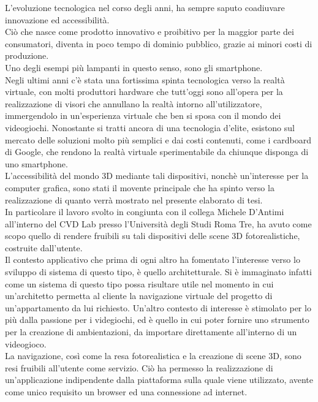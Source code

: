 L’evoluzione tecnologica nel corso degli anni, ha sempre saputo coadiuvare innovazione ed accessibilità.
\\
Ciò che nasce come prodotto innovativo e proibitivo per la maggior parte dei consumatori, diventa in poco tempo di dominio pubblico, grazie ai minori costi di produzione.
\\ 
Uno degli esempi più lampanti in questo senso, sono gli smartphone. 
\\
Negli ultimi anni c’è stata una fortissima spinta tecnologica verso la realtà virtuale, con molti produttori hardware che tutt’oggi sono all’opera per la realizzazione di visori che annullano la realtà intorno all’utilizzatore, immergendolo in un’esperienza virtuale che ben si sposa con il mondo dei videogiochi. Nonostante si tratti ancora di una tecnologia d’elite, esistono sul mercato delle soluzioni molto più semplici e dai costi contenuti, come i cardboard di Google, che rendono la realtà virtuale sperimentabile da chiunque disponga di uno smartphone. 
\\
L’accessibilità del mondo 3D mediante tali dispositivi, nonchè un’interesse per la computer grafica, sono stati il movente principale che ha spinto verso la realizzazione di quanto verrà mostrato nel presente elaborato di tesi.
\\
In particolare il lavoro svolto in congiunta con il collega Michele D’Antimi all’interno del CVD Lab presso l’Università degli Studi Roma Tre, ha avuto come scopo quello di rendere fruibili su tali dispositivi delle scene 3D fotorealistiche, costruite dall’utente.
\\
Il contesto applicativo che prima di ogni altro ha fomentato l’interesse verso lo sviluppo di sistema di questo tipo, è quello architetturale. Si è immaginato infatti come un sistema di questo tipo possa risultare utile nel momento in cui un’architetto permetta al cliente la navigazione virtuale del progetto di un’appartamento da lui richiesto. Un’altro contesto di interesse è stimolato per lo più dalla passione per i videgiochi, ed è quello in cui poter fornire uno strumento per la creazione di ambientazioni, da importare direttamente all’interno di un videogioco.
\\
La navigazione, così come la resa fotorealistica e la creazione di scene 3D, sono resi fruibili all’utente come servizio. Ciò ha permesso la realizzazione di un’applicazione indipendente dalla piattaforma sulla quale viene utilizzato, avente come unico requisito un browser ed una connessione ad internet. 
\\
